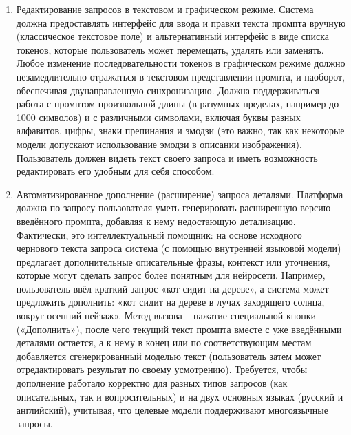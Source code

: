 \begin{enumerate}[label=\arabic*]
    \item Редактирование запросов в текстовом и графическом режиме. Система должна предоставлять интерфейс для ввода и правки текста промпта вручную (классическое текстовое поле) и альтернативный интерфейс в виде списка токенов, которые пользователь может перемещать, удалять или заменять. Любое изменение последовательности токенов в графическом режиме должно незамедлительно отражаться в текстовом представлении промпта, и наоборот, обеспечивая двунаправленную синхронизацию. Должна поддерживаться работа с промптом произвольной длины (в разумных пределах, например до 1000 символов) и с различными символами, включая буквы разных алфавитов, цифры, знаки препинания и эмодзи (это важно, так как некоторые модели допускают использование эмодзи в описании изображения)\cite{fusionbrain:docs}. Пользователь должен видеть текст своего запроса и иметь возможность редактировать его удобным для себя способом.
    \item Автоматизированное дополнение (расширение) запроса деталями. Платформа должна по запросу пользователя уметь генерировать расширенную версию введённого промпта, добавляя к нему недостающую детализацию. Фактически, это интеллектуальный помощник: на основе исходного чернового текста запроса система (с помощью внутренней языковой модели) предлагает дополнительные описательные фразы, контекст или уточнения, которые могут сделать запрос более понятным для нейросети. Например, пользователь ввёл краткий запрос «кот сидит на дереве», а система может предложить дополнить: «кот сидит на дереве в лучах заходящего солнца, вокруг осенний пейзаж». Метод вызова – нажатие специальной кнопки («Дополнить»), после чего текущий текст промпта вместе с уже введёнными деталями остается, а к нему в конец или по соответствующим местам добавляется сгенерированный моделью текст (пользователь затем может отредактировать результат по своему усмотрению). Требуется, чтобы дополнение работало корректно для разных типов запросов (как описательных, так и вопросительных) и на двух основных языках (русский и английский), учитывая, что целевые модели поддерживают многоязычные запросы.

\end{enumerate}
